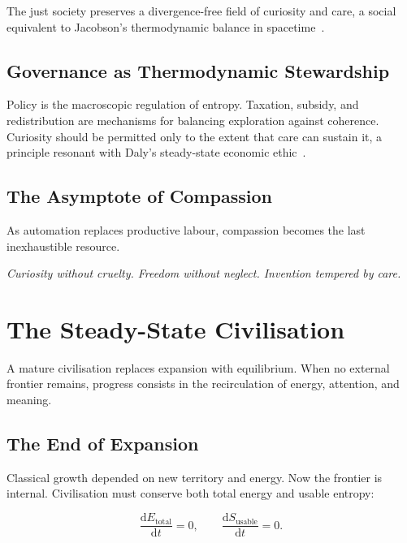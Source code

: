 \documentclass[12pt,a4paper]{article}
\theoremstyle{definition}
\newcommand{\ddt}[1]{\frac{\mathrm{d}#1}{\mathrm{d}t}}
\begin{document}
The just society preserves a divergence-free field of curiosity and care, a
social equivalent to Jacobson's thermodynamic balance in
spacetime~\citep{jacobson1995}.

\subsection{Governance as Thermodynamic Stewardship}

Policy is the macroscopic regulation of entropy.  Taxation, subsidy, and
redistribution are mechanisms for balancing exploration against coherence.
Curiosity should be permitted only to the extent that care can sustain it, a
principle resonant with Daly's steady-state economic
ethic~\citep{daly1977,foster2020}.

\subsection{The Asymptote of Compassion}

As automation replaces productive labour, compassion becomes the last
inexhaustible resource.

\medskip
\begin{center}
  \itshape
  Curiosity without cruelty.\quad
  Freedom without neglect.\quad
  Invention tempered by care.
\end{center}

\section{The Steady-State Civilisation}

A mature civilisation replaces expansion with equilibrium.  When no external
frontier remains, progress consists in the recirculation of energy, attention,
and meaning.

\subsection{The End of Expansion}

Classical growth depended on new territory and energy.  Now the frontier is
internal.  Civilisation must conserve both total energy and usable entropy:

\begin{equation}
  \ddt{E_{\mathrm{total}}} = 0, \qquad
  \ddt{S_{\mathrm{usable}}} = 0.
\end{equation}
\end{document}
